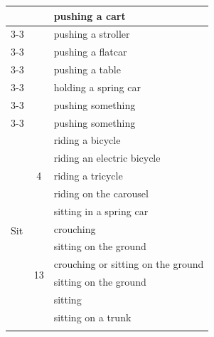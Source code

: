 \begin{appendix}
\begin{table}[ht]
{\begin{tabular}{l|c|l}
                                     &                     & pushing a cart                     \\ \cline{3-3} 
                                     &                     & pushing a stroller                 \\ \cline{3-3} 
                                     &                     & pushing a flatcar                  \\ \cline{3-3} 
                                     &                     & pushing a table                    \\ \cline{3-3} 
                                     &                     & holding a spring car               \\ \cline{3-3} 
                                     &                     & pushing something                  \\ \cline{3-3} 
                                     &                     & pushing something                  \\ \hline
\multirow{14}{*}{Sit}                & \multirow{5}{*}{4}  & riding a bicycle                   \\ \cline{3-3} 
                                     &                     & riding an electric bicycle         \\ \cline{3-3} 
                                     &                     & riding a tricycle                   \\ \cline{3-3} 
                                     &                     & riding on the carousel             \\ \cline{3-3} 
                                     &                     & sitting in a spring car            \\ \cline{2-3} 
                                     & \multirow{9}{*}{13} & crouching                          \\ \cline{3-3} 
                                     &                     & sitting on the ground              \\ \cline{3-3} 
                                     &                     & crouching or sitting on the ground \\ \cline{3-3} 
                                     &                     & sitting on the ground              \\ \cline{3-3} 
                                     &                     & sitting                            \\ \cline{3-3} 
                                     &                     & sitting on a trunk                 \\ \cline{3-3} 

\end{tabular}}
\end{table}
\end{appendix}
